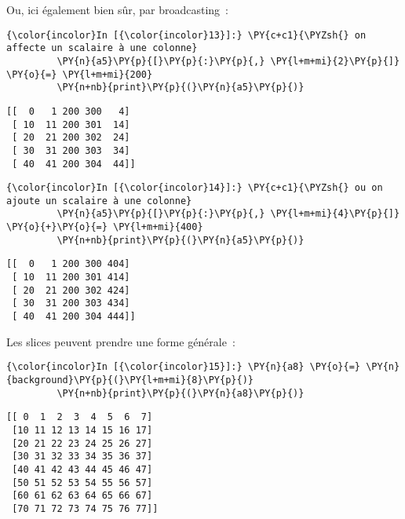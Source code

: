     Ou, ici également bien sûr, par broadcasting~:

    \begin{Verbatim}[commandchars=\\\{\}]
{\color{incolor}In [{\color{incolor}13}]:} \PY{c+c1}{\PYZsh{} on affecte un scalaire à une colonne}
         \PY{n}{a5}\PY{p}{[}\PY{p}{:}\PY{p}{,} \PY{l+m+mi}{2}\PY{p}{]} \PY{o}{=} \PY{l+m+mi}{200}
         \PY{n+nb}{print}\PY{p}{(}\PY{n}{a5}\PY{p}{)}
\end{Verbatim}


    \begin{Verbatim}[commandchars=\\\{\}]
[[  0   1 200 300   4]
 [ 10  11 200 301  14]
 [ 20  21 200 302  24]
 [ 30  31 200 303  34]
 [ 40  41 200 304  44]]

    \end{Verbatim}

    \begin{Verbatim}[commandchars=\\\{\}]
{\color{incolor}In [{\color{incolor}14}]:} \PY{c+c1}{\PYZsh{} ou on ajoute un scalaire à une colonne}
         \PY{n}{a5}\PY{p}{[}\PY{p}{:}\PY{p}{,} \PY{l+m+mi}{4}\PY{p}{]} \PY{o}{+}\PY{o}{=} \PY{l+m+mi}{400}
         \PY{n+nb}{print}\PY{p}{(}\PY{n}{a5}\PY{p}{)}
\end{Verbatim}


    \begin{Verbatim}[commandchars=\\\{\}]
[[  0   1 200 300 404]
 [ 10  11 200 301 414]
 [ 20  21 200 302 424]
 [ 30  31 200 303 434]
 [ 40  41 200 304 444]]

    \end{Verbatim}

    Les slices peuvent prendre une forme générale~:

    \begin{Verbatim}[commandchars=\\\{\}]
{\color{incolor}In [{\color{incolor}15}]:} \PY{n}{a8} \PY{o}{=} \PY{n}{background}\PY{p}{(}\PY{l+m+mi}{8}\PY{p}{)}
         \PY{n+nb}{print}\PY{p}{(}\PY{n}{a8}\PY{p}{)}
\end{Verbatim}


    \begin{Verbatim}[commandchars=\\\{\}]
[[ 0  1  2  3  4  5  6  7]
 [10 11 12 13 14 15 16 17]
 [20 21 22 23 24 25 26 27]
 [30 31 32 33 34 35 36 37]
 [40 41 42 43 44 45 46 47]
 [50 51 52 53 54 55 56 57]
 [60 61 62 63 64 65 66 67]
 [70 71 72 73 74 75 76 77]]

    \end{Verbatim}

